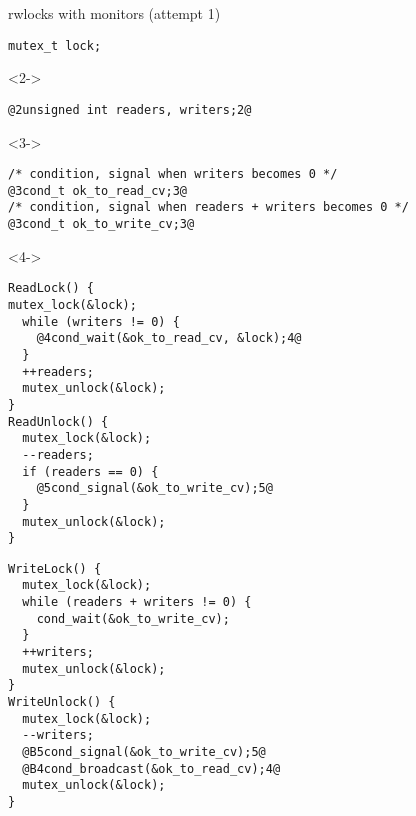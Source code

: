 \begin{frame}[fragile,label=rwlockMonitors1]{rwlocks with monitors (attempt 1)}
\begin{lstlisting}
mutex_t lock;
\end{lstlisting}
\vspace{-.3cm}
\begin{visibleenv}<2->
\begin{lstlisting}
@2unsigned int readers, writers;2@
\end{lstlisting}
\end{visibleenv}
\vspace{-.3cm}
\begin{visibleenv}<3->
\begin{lstlisting}
/* condition, signal when writers becomes 0 */
@3cond_t ok_to_read_cv;3@
/* condition, signal when readers + writers becomes 0 */
@3cond_t ok_to_write_cv;3@
\end{lstlisting}
\end{visibleenv}
\vspace{-.3cm}
\begin{visibleenv}<4->
\begin{minipage}{0.45\textwidth}
\begin{lstlisting}
ReadLock() {
mutex_lock(&lock);
  while (writers != 0) {
    @4cond_wait(&ok_to_read_cv, &lock);4@
  }
  ++readers;
  mutex_unlock(&lock);
}
ReadUnlock() {
  mutex_lock(&lock);
  --readers;
  if (readers == 0) {
    @5cond_signal(&ok_to_write_cv);5@
  }
  mutex_unlock(&lock);
}
\end{lstlisting}
\end{minipage}
\begin{minipage}{0.45\textwidth}
\begin{lstlisting}
WriteLock() {
  mutex_lock(&lock);
  while (readers + writers != 0) {
    cond_wait(&ok_to_write_cv);
  }
  ++writers;
  mutex_unlock(&lock);
}
WriteUnlock() {
  mutex_lock(&lock);
  --writers;
  @B5cond_signal(&ok_to_write_cv);5@
  @B4cond_broadcast(&ok_to_read_cv);4@
  mutex_unlock(&lock);
}
\end{lstlisting}
\end{minipage}
\end{visibleenv}
\vspace{-.3cm}


\end{frame}
